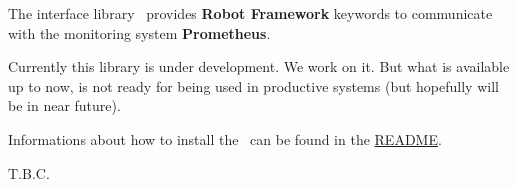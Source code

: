 %



%

The interface library \pkg\ provides \textbf{Robot Framework} keywords to communicate with the monitoring system \textbf{Prometheus}.


Currently this library is under development. We work on it. But what is available up to now, is not ready for being used in productive systems
(but hopefully will be in near future).

Informations about how to install the \pkg\ can be found in the
\href{https://github.com/test-fullautomation/robotframework-prometheus/blob/develop/README.rst}{README}.

T.B.C.
